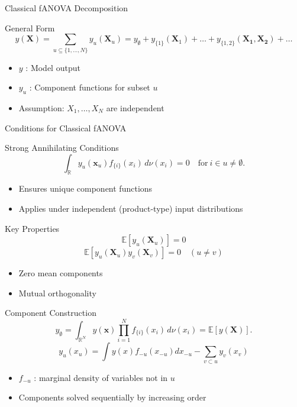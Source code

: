 \begin{frame}{Classical fANOVA Decomposition} %
  \begin{block}{General Form}
    \[
      y(\boldsymbol{X}) = \sum_{u \subseteq \{1,\dots,N\}} y_{u}(\boldsymbol{X}_u) = y_{\emptyset} + y_{\{1\}}(\boldsymbol{X}_1) + \dots + y_{\{1, 2\}}(\boldsymbol{X_1, X_2}) + \dots
    \]
  \end{block}
  \begin{itemize}
    \item $y$ : Model output
    \item $y_u$ : Component functions for subset $u$
    \item Assumption: $X_1, \dots, X_N$ are independent
  \end{itemize}
\end{frame}

\begin{frame}{Conditions for Classical fANOVA} %
  \begin{block}{Strong Annihilating Conditions}
    \[
      \int_{\mathbb{R}} y_u(\boldsymbol{x}_u) f_{\{i\}}(x_i) \, d\nu(x_i) = 0 \quad \text{for} \ i \in u \neq \emptyset.
    \]
  \end{block}
  \begin{itemize}
    \item Ensures unique component functions
    \item Applies under independent (product-type) input distributions
  \end{itemize}
\end{frame}

\begin{frame}{Key Properties}
  \[
    \mathbb{E}[y_u(\boldsymbol{X}_u)] = 0
  \]
  \[
    \mathbb{E}[y_u(\boldsymbol{X}_u) y_v(\boldsymbol{X}_v)] = 0 \quad (u \neq v)
  \]
  \begin{itemize}
    \item Zero mean components
    \item Mutual orthogonality
  \end{itemize}
\end{frame}

\begin{frame}{Component Construction} %
    \[
    y_{\emptyset} = \int_{\mathbb{R}^N} y(\boldsymbol{x}) \prod_{i=1}^{N} f_{\{i\}}(x_i) \, d\nu (x_i) = \mathbb{E}[y(\boldsymbol{X})].
    \]
    \[
      y_u(x_u) =
        \int y(x) f_{-u}(x_{-u}) dx_{-u}
        - \sum_{v \subset u} y_v(x_v)
    \]
  \begin{itemize}
    \item $f_{-u}$ : marginal density of variables not in $u$
    \item Components solved sequentially by increasing order
  \end{itemize}
\end{frame}

